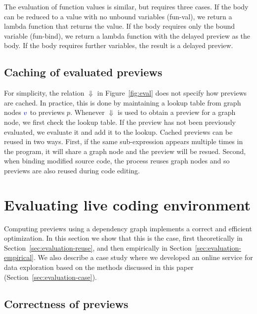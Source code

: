 \documentclass[english,submission]{programming}
\theoremstyle{plain}
\theoremstyle{definition}
\newcommand{\bndclr}[1]{\textcolor{kvdclr}{#1}}
\newcommand{\rname}[1]{{\sffamily(#1)}}
\begin{document}
The evaluation of function values is similar, but requires three cases. If the body can
be reduced to a value with no unbound variables \rname{fun-val}, we return a lambda function that
returns the value. If the body requires only the bound variable \rname{fun-bind}, we return a
lambda function with the delayed preview as the body. If the body requires further variables,
the result is a delayed preview.

\subsection{Caching of evaluated previews}
\label{sec:previews-cache}

For simplicity, the relation $\Downarrow$ in Figure~\ref{fig:eval} does not specify how previews
are cached. In practice, this is done by maintaining a lookup table from graph nodes $\bndclr{v}$
to previews $p$. Whenever $\Downarrow$ is used to obtain a preview for a graph node, we first
check the lookup table. If the preview has not been previously evaluated, we evaluate it and add
it to the lookup. Cached previews can be reused in two ways. First, if the same sub-expression
appears multiple times in the program, it will share a graph node and the preview will be resued.
Second, when binding modified source code, the process reuses graph nodes and so previews are
also reused during code editing.


\section{Evaluating live coding environment}
\label{sec:evaluation}

Computing previews using a dependency graph implements a correct and efficient optimization.
In this section we show that this is the case, first theoretically in Section~\ref{sec:evaluation-reuse},
and then empirically in Section~\ref{sec:evaluation-empirical}. We also describe a case study where
we developed an online service for data exploration based on the methods discussed in this paper
(Section~\ref{sec:evaluation-case}).


\subsection{Correctness of previews}
\label{sec:evaluation-correctness}
\end{document}
